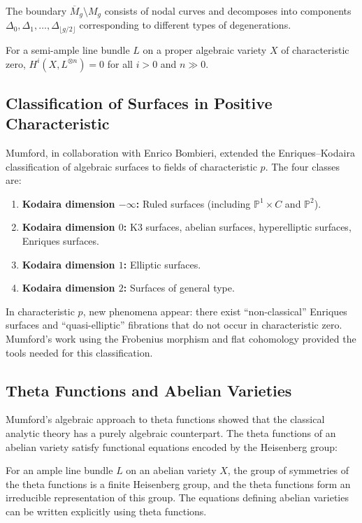 The boundary $\overline{M}_g \setminus M_g$ consists of nodal curves and decomposes into components $\Delta_0, \Delta_1, \dots, \Delta_{\lfloor g/2 \rfloor}$ corresponding to different types of degenerations.

\begin{theorem}
For a semi-ample line bundle $L$ on a proper algebraic variety $X$ of characteristic zero, $H^i(X, L^{\otimes n}) = 0$ for all $i > 0$ and $n \gg 0$.
\end{theorem}

\subsection{Classification of Surfaces in Positive Characteristic}

Mumford, in collaboration with Enrico Bombieri, extended the Enriques--Kodaira classification of algebraic surfaces to fields of characteristic $p$. The four classes are:

\begin{enumerate}
    \item \textbf{Kodaira dimension $-\infty$:} Ruled surfaces (including $\mathbb{P}^1 \times C$ and $\mathbb{P}^2$).
    \item \textbf{Kodaira dimension $0$:} K3 surfaces, abelian surfaces, hyperelliptic surfaces, Enriques surfaces.
    \item \textbf{Kodaira dimension $1$:} Elliptic surfaces.
    \item \textbf{Kodaira dimension $2$:} Surfaces of general type.
\end{enumerate}

In characteristic $p$, new phenomena appear: there exist ``non-classical'' Enriques surfaces and ``quasi-elliptic'' fibrations that do not occur in characteristic zero. Mumford's work using the Frobenius morphism and flat cohomology provided the tools needed for this classification.

\subsection{Theta Functions and Abelian Varieties}

Mumford's algebraic approach to theta functions showed that the classical analytic theory has a purely algebraic counterpart. The theta functions of an abelian variety satisfy functional equations encoded by the Heisenberg group:

\begin{theorem}
For an ample line bundle $L$ on an abelian variety $X$, the group of symmetries of the theta functions is a finite Heisenberg group, and the theta functions form an irreducible representation of this group. The equations defining abelian varieties can be written explicitly using theta functions.
\end{theorem}

